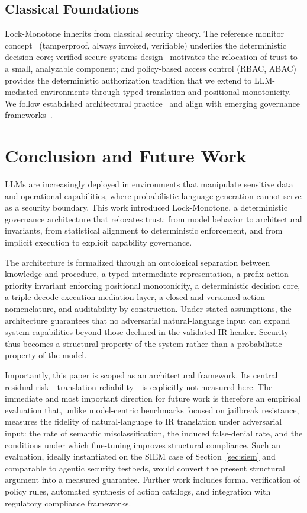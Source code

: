 \documentclass[conference]{IEEEtran}
\begin{document}
\subsection{Classical Foundations}
Lock-Monotone inherits from classical security theory. The reference
monitor concept~\cite{saltzer1975protection} (tamperproof, always invoked,
verifiable) underlies the deterministic decision core; verified secure
systems design~\cite{rushby1981design} motivates the relocation of trust
to a small, analyzable component; and policy-based access control (RBAC,
ABAC) provides the deterministic authorization tradition that we extend to
LLM-mediated environments through typed translation and positional
monotonicity. We follow established architectural
practice~\cite{bass2012software} and align with emerging governance
frameworks~\cite{nist2023airmf, eu2024aiact}.

\section{Conclusion and Future Work}
\label{sec:conclusion}

LLMs are increasingly deployed in environments that manipulate sensitive
data and operational capabilities, where probabilistic language generation
cannot serve as a security boundary. This work introduced Lock-Monotone, a
deterministic governance architecture that relocates trust: from model
behavior to architectural invariants, from statistical alignment to
deterministic enforcement, and from implicit execution to explicit
capability governance.

The architecture is formalized through an ontological separation between
knowledge and procedure, a typed intermediate representation, a prefix
action priority invariant enforcing positional monotonicity, a
deterministic decision core, a triple-decode execution mediation layer, a
closed and versioned action nomenclature, and auditability by
construction. Under stated assumptions, the architecture guarantees that
no adversarial natural-language input can expand system capabilities
beyond those declared in the validated IR header. Security thus becomes a
structural property of the system rather than a probabilistic property of
the model.

Importantly, this paper is scoped as an architectural framework. Its
central residual risk---translation reliability---is explicitly not
measured here. The immediate and most important direction for future work
is therefore an empirical evaluation that, unlike model-centric benchmarks
focused on jailbreak resistance, measures the fidelity of natural-language
to IR translation under adversarial input: the rate of semantic
misclassification, the induced false-denial rate, and the conditions under
which fine-tuning improves structural compliance. Such an evaluation,
ideally instantiated on the SIEM case of Section~\ref{sec:siem} and
comparable to agentic security testbeds, would convert the present
structural argument into a measured guarantee. Further work includes
formal verification of policy rules, automated synthesis of action
catalogs, and integration with regulatory compliance frameworks.
\end{document}
